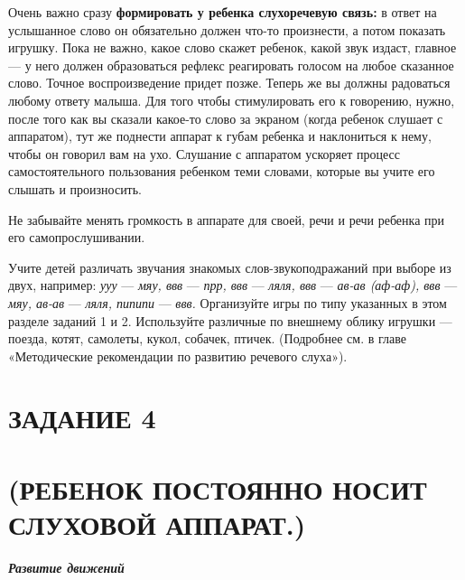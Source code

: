 \documentclass[a5paper]{book}
\renewcommand{\emph}[1]{\textit{#1}}
\begin{document}
Очень важно сразу \textbf{формировать у ребенка слухоречевую связь:} в
ответ на услышанное слово он обязательно должен что-то произнести, а
потом показать игрушку. Пока не важно, какое слово скажет ребенок, какой
звук издаст, главное --- у него должен образоваться рефлекс реагировать
голосом на любое сказанное слово. Точное воспроизведение придет позже.
Теперь же вы должны радоваться любому ответу малыша. Для того чтобы
стимулировать его к говорению, нужно, после того как вы сказали какое-то
слово за экраном (когда ребенок слушает с аппаратом), тут же поднести
аппарат к губам ребенка и наклониться к нему, чтобы он говорил вам на
ухо. Слушание с аппаратом ускоряет процесс самостоятельного пользования
ребенком теми словами, которые вы учите его слышать и произносить.

Не забывайте менять громкость в аппарате для своей, речи и речи ребенка
при его самопрослушивании.

Учите детей различать звучания знакомых слов-звукоподражаний при выборе
из двух, например: \emph{ууу} --- \emph{мяу, ввв} --- \emph{прр, ввв}
--- \emph{ляля, ввв} --- \emph{ав-ав (аф-аф), ввв} --- \emph{мяу, ав-ав}
--- \emph{ляля, пипипи} --- \emph{ввв.} Организуйте игры по типу
указанных в этом разделе заданий 1 и 2. Используйте различные по
внешнему облику игрушки --- поезда, котят, самолеты, кукол, собачек,
птичек. (Подробнее см. в главе «Методические рекомендации по развитию
речевого слуха»).

\section{ЗАДАНИЕ 4}\section*{(РЕБЕНОК ПОСТОЯННО НОСИТ СЛУХОВОЙ АППАРАТ.)}

\emph{\textbf{Развитие движений}}
\end{document}
